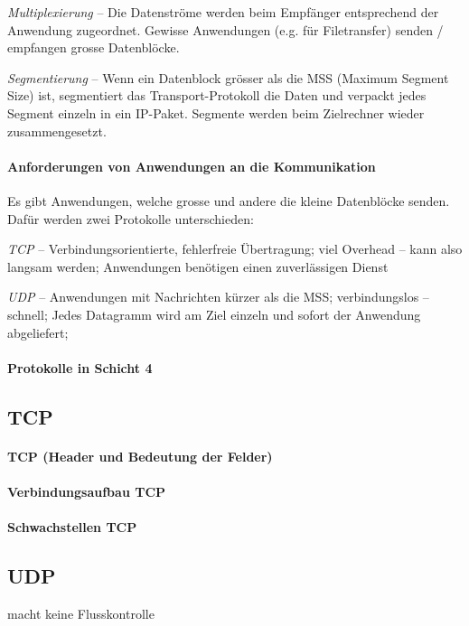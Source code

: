 \documentclass[a4paper,12pt]{article}
\begin{document}
\emph{Multiplexierung} -- Die Datenströme werden beim Empfänger entsprechend der Anwendung zugeordnet. Gewisse Anwendungen (e.g. für Filetransfer) senden / empfangen grosse Datenblöcke.

\emph{Segmentierung} -- Wenn ein Datenblock grösser als die MSS (Maximum Segment Size) ist, segmentiert das Transport-Protokoll die Daten und verpackt jedes Segment einzeln in ein IP-Paket. Segmente werden beim Zielrechner wieder zusammengesetzt.

\paragraph{Anforderungen von Anwendungen an die Kommunikation} Es gibt Anwendungen, welche grosse und andere die kleine Datenblöcke senden. Dafür werden zwei Protokolle unterschieden:

\emph{TCP} -- Verbindungsorientierte, fehlerfreie Übertragung; viel Overhead -- kann also langsam werden; Anwendungen benötigen einen zuverlässigen Dienst

\emph{UDP} -- Anwendungen mit Nachrichten kürzer als die MSS; verbindungslos -- schnell; Jedes Datagramm wird am Ziel einzeln und sofort der Anwendung abgeliefert;

\paragraph{Protokolle in Schicht 4}


\subsection{TCP}

\paragraph{TCP (Header und Bedeutung der Felder)}


\paragraph{Verbindungsaufbau TCP}

\paragraph{Schwachstellen TCP}


\subsection{UDP}
macht keine Flusskontrolle
\end{document}

